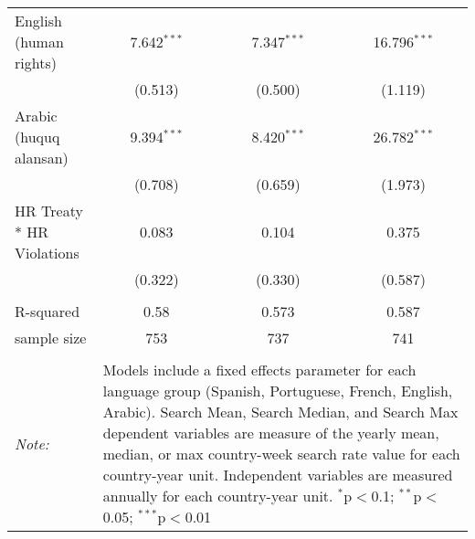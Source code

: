 \begin{table}[!htbp]
\begin{tabular}{@{\extracolsep{5pt}}lccc}
  English (human rights) & 7.642$^{***}$ & 7.347$^{***}$ & 16.796$^{***}$ \\ 
  & (0.513) & (0.500) & (1.119) \\ 
  Arabic (huquq alansan) & 9.394$^{***}$ & 8.420$^{***}$ & 26.782$^{***}$ \\ 
  & (0.708) & (0.659) & (1.973) \\ 
  HR Treaty * HR Violations & 0.083 & 0.104 & 0.375 \\ 
  & (0.322) & (0.330) & (0.587) \\ 
 \hline \\[-1.8ex] 
R-squared  & 0.58 & 0.573 & 0.587 \\ 
sample size  & 753 & 737 & 741 \\ 
\hline 
\hline \\[-1.8ex] 
\textit{Note:}  & \multicolumn{3}{l}{\parbox[t]{8cm}{Models include a fixed effects parameter for each language group (Spanish, Portuguese, French, English, Arabic). Search Mean, Search Median, and Search Max dependent variables are measure of the yearly mean, median, or max country-week search rate value for each country-year unit. Independent variables are measured annually for each country-year unit. $^{*}$p$<$0.1; $^{**}$p$<$0.05; $^{***}$p$<$0.01}} \\ 
\end{tabular} 
\end{table} 
